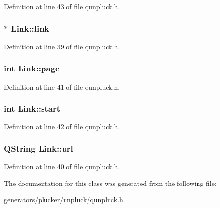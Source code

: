 Definition at line 43 of file qunpluck.\+h.

\hypertarget{classLink_aed1992084326da1e4ff2e5945f347c44}{
\subsubsection[{link}]{$\ast$ Link\+::link}}\label{classLink_aed1992084326da1e4ff2e5945f347c44}


Definition at line 39 of file qunpluck.\+h.

\hypertarget{classLink_aca0c87c763f33f0c2711cf860019b323}{
\subsubsection[{page}]{\setlength{\rightskip}{0pt plus 5cm}int Link\+::page}}\label{classLink_aca0c87c763f33f0c2711cf860019b323}


Definition at line 41 of file qunpluck.\+h.

\hypertarget{classLink_ab8d456d8c98a6af039618dbe624c9014}{
\subsubsection[{start}]{\setlength{\rightskip}{0pt plus 5cm}int Link\+::start}}\label{classLink_ab8d456d8c98a6af039618dbe624c9014}


Definition at line 42 of file qunpluck.\+h.

\hypertarget{classLink_a7fb909ac63ae82139c3cf3a84cb367b1}{
\subsubsection[{url}]{\setlength{\rightskip}{0pt plus 5cm}Q\+String Link\+::url}}\label{classLink_a7fb909ac63ae82139c3cf3a84cb367b1}


Definition at line 40 of file qunpluck.\+h.



The documentation for this class was generated from the following file\+:\begin{DoxyCompactItemize}
\item 
generators/plucker/unpluck/\hyperlink{qunpluck_8h}{qunpluck.\+h}\end{DoxyCompactItemize}
